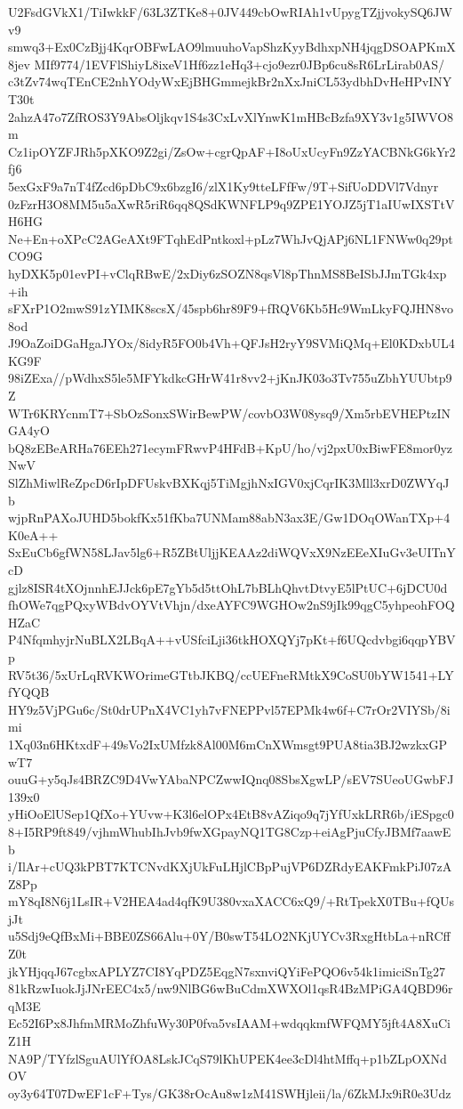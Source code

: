 U2FsdGVkX1/TiIwkkF/63L3ZTKe8+0JV449cbOwRIAh1vUpygTZjjvokySQ6JWv9
smwq3+Ex0CzBjj4KqrOBFwLAO9lmuuhoVapShzKyyBdhxpNH4jqgDSOAPKmX8jev
MIf9774/1EVFlShiyL8ixeV1Hf6zz1eHq3+cjo9ezr0JBp6cu8sR6LrLirab0AS/
c3tZv74wqTEnCE2nhYOdyWxEjBHGmmejkBr2nXxJniCL53ydbhDvHeHPvINYT30t
2ahzA47o7ZfROS3Y9AbsOljkqv1S4s3CxLvXlYnwK1mHBcBzfa9XY3v1g5IWVO8m
Cz1ipOYZFJRh5pXKO9Z2gi/ZsOw+cgrQpAF+I8oUxUcyFn9ZzYACBNkG6kYr2fj6
5exGxF9a7nT4fZcd6pDbC9x6bzgI6/zlX1Ky9tteLFfFw/9T+SifUoDDVl7Vdnyr
0zFzrH3O8MM5u5aXwR5riR6qq8QSdKWNFLP9q9ZPE1YOJZ5jT1aIUwIXSTtVH6HG
Ne+En+oXPcC2AGeAXt9FTqhEdPntkoxl+pLz7WhJvQjAPj6NL1FNWw0q29ptCO9G
hyDXK5p01evPI+vClqRBwE/2xDiy6zSOZN8qsVl8pThnMS8BeISbJJmTGk4xp+ih
sFXrP1O2mwS91zYIMK8scsX/45spb6hr89F9+fRQV6Kb5Hc9WmLkyFQJHN8vo8od
J9OaZoiDGaHgaJYOx/8idyR5FO0b4Vh+QFJsH2ryY9SVMiQMq+El0KDxbUL4KG9F
98iZExa//pWdhxS5le5MFYkdkcGHrW41r8vv2+jKnJK03o3Tv755uZbhYUUbtp9Z
WTr6KRYcnmT7+SbOzSonxSWirBewPW/covbO3W08ysq9/Xm5rbEVHEPtzINGA4yO
bQ8zEBeARHa76EEh271ecymFRwvP4HFdB+KpU/ho/vj2pxU0xBiwFE8mor0yzNwV
SlZhMiwlReZpcD6rIpDFUskvBXKqj5TiMgjhNxIGV0xjCqrIK3Mll3xrD0ZWYqJb
wjpRnPAXoJUHD5bokfKx51fKba7UNMam88abN3ax3E/Gw1DOqOWanTXp+4K0eA++
SxEuCb6gfWN58LJav5lg6+R5ZBtUljjKEAAz2diWQVxX9NzEEeXIuGv3eUITnYcD
gjlz8ISR4tXOjnnhEJJck6pE7gYb5d5ttOhL7bBLhQhvtDtvyE5lPtUC+6jDCU0d
fhOWe7qgPQxyWBdvOYVtVhjn/dxeAYFC9WGHOw2nS9jIk99qgC5yhpeohFOQHZaC
P4NfqmhyjrNuBLX2LBqA++vUSfciLji36tkHOXQYj7pKt+f6UQcdvbgi6qqpYBVp
RV5t36/5xUrLqRVKWOrimeGTtbJKBQ/ccUEFneRMtkX9CoSU0bYW1541+LYfYQQB
HY9z5VjPGu6c/St0drUPnX4VC1yh7vFNEPPvl57EPMk4w6f+C7rOr2VIYSb/8imi
1Xq03n6HKtxdF+49sVo2IxUMfzk8Al00M6mCnXWmsgt9PUA8tia3BJ2wzkxGPwT7
ouuG+y5qJs4BRZC9D4VwYAbaNPCZwwIQnq08SbsXgwLP/sEV7SUeoUGwbFJ139x0
yHiOoElUSep1QfXo+YUvw+K3l6elOPx4EtB8vAZiqo9q7jYfUxkLRR6b/iESpgc0
8+I5RP9ft849/vjhmWhubIhJvb9fwXGpayNQ1TG8Czp+eiAgPjuCfyJBMf7aawEb
i/IlAr+cUQ3kPBT7KTCNvdKXjUkFuLHjlCBpPujVP6DZRdyEAKFmkPiJ07zAZ8Pp
mY8qI8N6j1LsIR+V2HEA4ad4qfK9U380vxaXACC6xQ9/+RtTpekX0TBu+fQUsjJt
u5Sdj9eQfBxMi+BBE0ZS66Alu+0Y/B0swT54LO2NKjUYCv3RxgHtbLa+nRCffZ0t
jkYHjqqJ67cgbxAPLYZ7CI8YqPDZ5EqgN7sxnviQYiFePQO6v54k1imiciSnTg27
81kRzwIuokJjJNrEEC4x5/nw9NlBG6wBuCdmXWXOl1qsR4BzMPiGA4QBD96rqM3E
Ec52I6Px8JhfmMRMoZhfuWy30P0fva5vsIAAM+wdqqkmfWFQMY5jft4A8XuCiZ1H
NA9P/TYfzlSguAUlYfOA8LskJCqS79lKhUPEK4ee3cDl4htMffq+p1bZLpOXNdOV
oy3y64T07DwEF1cF+Tys/GK38rOcAu8w1zM41SWHjleii/la/6ZkMJx9iR0e3Udz
